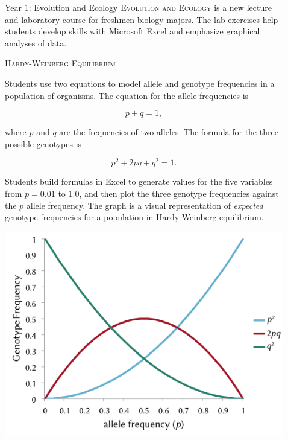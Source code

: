 \documentclass[final,hyperref={pdfpagelabels=false}]{beamer}
\newcommand{\whitespace}{\vspace{0.5\baselineskip}}
\newlength{\sepwid}
\newlength{\onecolwid}
\begin{document}
\begin{frame}[t]
\begin{columns}[t]
\begin{column}{\onecolwid}
	\end{column}
	\begin{column}{\sepwid}
	\end{column}
	\begin{column}{\onecolwid}
	    \begin{block}{Year 1: Evolution and Ecology}
    	   	\textsc{Evolution and Ecology} is a new lecture and laboratory course for freshmen biology majors. The lab exercises help students develop skills with Microsoft Excel and emphasize graphical analyses of data.
			
			\whitespace
			
			\textsc{Hardy-Weinberg Equilibrium}
			
			Students use two equations to model allele and genotype frequencies in a population of organisms. The equation for the allele frequencies is
			
			\begin{equation*}
				p + q = 1,
			\end{equation*}
			
			where $p$ and $q$ are the frequencies of two alleles. The formula for the three possible genotypes is
			
			\begin{equation*}
				p^2 + 2pq + q^2 = 1.
			\end{equation*}
						
			Students build formulas in Excel to generate values for the five variables from $p = 0.01$ to $1.0$, and then plot the three genotype frequencies against the $p$ allele frequency. The graph is a visual representation of \textit{expected} genotype frequencies for a population in Hardy-Weinberg equilibrium.
						
			\whitespace

			\includegraphics[width=\textwidth]{hwe_graph}
			

\end{block}
\end{column}
\end{columns}
\end{frame}
\end{document}
